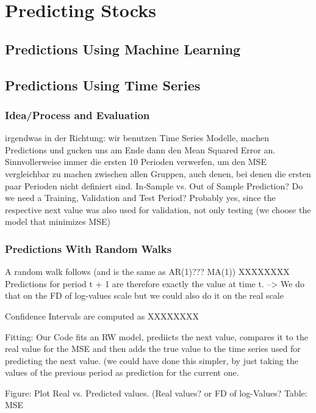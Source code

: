 \chapter{Predicting Stocks}\label{ch:predictions}


\section{Predictions Using Machine Learning}

\section{Predictions Using Time Series}
\subsection{Idea/Process and Evaluation}
irgendwas in der Richtung: wir benutzen Time Series Modelle, machen Predictions und gucken uns am Ende dann den Mean Squared Error an. Sinnvollerweise immer die ersten 10 Perioden verwerfen, um den MSE vergleichbar zu machen zwischen allen Gruppen, auch denen, bei denen die ersten paar Perioden nicht definiert sind. 	
In-Sample vs. Out of Sample Prediction?
Do we need a Training, Validation and Test Period? Probably yes, since the respective next value was also used for validation, not only testing (we choose the model that minimizes MSE)





\subsection{Predictions With Random Walks}
A random walk follows (and is the same as AR(1)??? MA(1))
XXXXXXXX
Predictions for period t + 1 are therefore exactly the value at time t. --> We do that on the FD of log-values scale but we could also do it on the real scale

Confidence Intervals are computed as
XXXXXXXX

Fitting: 
Our Code fits an RW model, prediicts the next value, compares it to the real value for the MSE and then adds the true value to the time series used for predicting the next value. (we could have done this simpler, by just taking the values of the previous period as prediction for the current one. 

Figure: Plot Real vs. Predicted values. (Real values? or FD of log-Values?
Table: MSE

